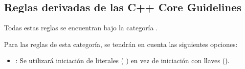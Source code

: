 \subsection{Reglas derivadas de las C++ Core Guidelines}

Todas estas reglas se encuentran bajo la categoría .

Para las reglas de esta categoría, se tendrán en cuenta las siguientes
opciones:

\begin{itemize}

\item {}:
Se utilizará iniciación de literales ( )
en vez de iniciación con llaves ().

\end{itemize}

